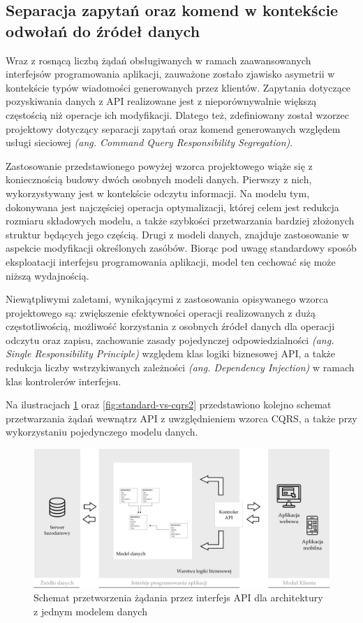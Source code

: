 \subsection*{Separacja zapytań oraz komend w kontekście odwołań do źródeł danych}
Wraz z rosnącą liczbą żądań obsługiwanych w ramach zaawansowanych interfejsów programowania aplikacji, zauważone zostało zjawisko asymetrii w kontekście typów wiadomości generowanych przez klientów. Zapytania dotyczące pozyskiwania danych z API realizowane jest z nieporównywalnie większą częstością niż operacje ich modyfikacji. Dlatego też, zdefiniowany został wzorzec projektowy dotyczący separacji zapytań oraz komend generowanych względem usługi sieciowej \textit{(ang. Command Query Responsibility Segregation)}.

Zastosowanie przedstawionego powyżej wzorca projektowego wiąże się z koniecznością budowy dwóch osobnych modeli danych. Pierwszy z nich, wykorzystywany jest w kontekście odczytu informacji. Na modelu tym, dokonywana jest najczęściej operacja optymalizacji, której celem jest redukcja rozmiaru składowych modelu, a także szybkości przetwarzania bardziej złożonych struktur będących jego częścią. Drugi z modeli danych, znajduje zastosowanie w aspekcie modyfikacji określonych zasóbów. Biorąc pod uwagę standardowy sposób eksploatacji interfejsu programowania aplikacji, model ten cechować się może niższą wydajnością.  

Niewątpliwymi zaletami, wynikającymi z zastosowania opisywanego wzorca projektowego są: zwiększenie efektywności operacji realizowanych z dużą częstotliwością, możliwość korzystania z osobnych źródeł danych dla operacji odczytu oraz zapisu, zachowanie zasady pojedynczej odpowiedzialności \textit{(ang. Single Responsibility Principle)} względem klas logiki biznesowej API, a także redukcja liczby wstrzykiwanych zależności \textit{(ang. Dependency Injection)} w ramach klas kontrolerów interfejsu.

Na ilustracjach \ref{fig:standard-vs-cqrs1} oraz \ref{fig:standard-vs-cqrs2} przedstawiono kolejno schemat przetwarzania żądań wewnątrz API z uwzględnieniem wzorca CQRS, a także przy wykorzystaniu pojedynczego modelu danych.

\begin{figure}[ht]
    \centering
     \includegraphics[width=0.9\linewidth]{rys02/standard-vs-cqrs1.png}
    \caption{Schemat przetworzenia żądania przez interfejs API dla architektury z jednym modelem danych}
    \label{fig:standard-vs-cqrs1}
   \end{figure}


